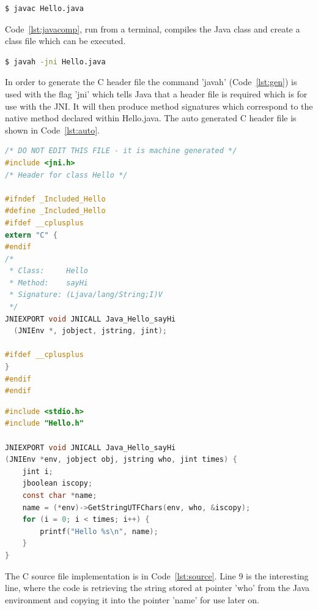 \documentclass[a4paper, titlepage]{article}
\begin{document}
\begin{lstlisting}[language=sh, caption={Compiling basic Java program}, label=lst:javacomp]
$ javac Hello.java
\end{lstlisting}

Code~\ref{lst:javacomp}, run from a terminal, compiles the Java class and create a class file which can be executed.

\begin{lstlisting}[language=sh, caption={Generating C header file}, label=lst:gen]
$ javah -jni Hello.java
\end{lstlisting}

In order to generate the C header file the command 'javah' (Code~\ref{lst:gen}) is used with the flag 'jni' which tells Java that a header file is required which is for use with the JNI. It will then produce method signatures which correspond to the native method declared within Hello.java. The auto generated C header file is shown in Code~\ref{lst:auto}.

\begin{lstlisting}[language=C, caption={Auto-generated C header file}, label=lst:auto]
/* DO NOT EDIT THIS FILE - it is machine generated */
#include <jni.h>
/* Header for class Hello */

#ifndef _Included_Hello
#define _Included_Hello
#ifdef __cplusplus
extern "C" {
#endif
/*
 * Class:     Hello
 * Method:    sayHi
 * Signature: (Ljava/lang/String;I)V
 */
JNIEXPORT void JNICALL Java_Hello_sayHi
  (JNIEnv *, jobject, jstring, jint);

#ifdef __cplusplus
}
#endif
#endif
\end{lstlisting}

\begin{lstlisting}[language=C, caption={C source file corresponding to auto-generated header file}, label=lst:source]
#include <stdio.h>
#include "Hello.h"

JNIEXPORT void JNICALL Java_Hello_sayHi
(JNIEnv *env, jobject obj, jstring who, jint times) {
    jint i;
    jboolean iscopy;
    const char *name;
    name = (*env)->GetStringUTFChars(env, who, &iscopy);
    for (i = 0; i < times; i++) {
        printf("Hello %s\n", name);
    }
}
\end{lstlisting}

The C source file implementation is in Code~\ref{lst:source}. Line 9 is the interesting line, where the code is retrieving the string stored at pointer 'who' from the Java environment and copying it into the pointer 'name' for use later on.
\end{document}
